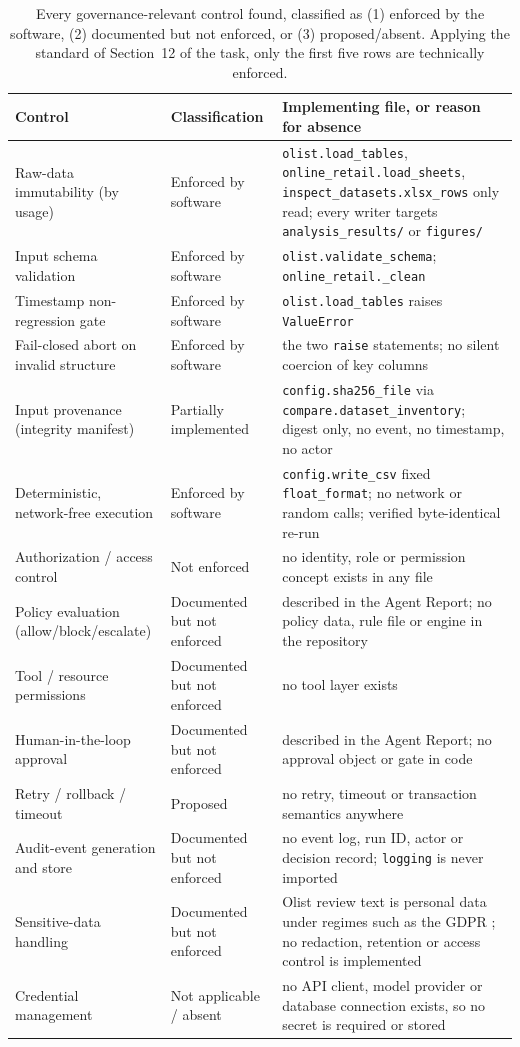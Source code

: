 \documentclass[11pt,a4paper]{article}
\newcommand{\code}[1]{\texttt{#1}}
\begin{document}
\begin{table}[H]
\centering
\small
\begin{tabularx}{\textwidth}{L{3.6cm}L{3.4cm}X}
\toprule
\textbf{Control} & \textbf{Classification} & \textbf{Implementing file, or reason for absence} \\
\midrule
Raw-data immutability (by usage) & Enforced by software & \code{olist.load\_tables}, \code{online\_retail.load\_sheets}, \code{inspect\_datasets.xlsx\_rows} only read; every writer targets \code{analysis\_results/} or \code{figures/} \\
Input schema validation & Enforced by software & \code{olist.validate\_schema}; \code{online\_retail.\_clean} \\
Timestamp non-regression gate & Enforced by software & \code{olist.load\_tables} raises \code{ValueError} \\
Fail-closed abort on invalid structure & Enforced by software & the two \code{raise} statements; no silent coercion of key columns \\
Input provenance (integrity manifest) & Partially implemented & \code{config.sha256\_file} via \code{compare.dataset\_inventory}; digest only, no event, no timestamp, no actor \\
Deterministic, network-free execution & Enforced by software & \code{config.write\_csv} fixed \code{float\_format}; no network or random calls; verified byte-identical re-run \\
Authorization / access control & Not enforced & no identity, role or permission concept exists in any file \\
Policy evaluation (allow/block/escalate) & Documented but not enforced & described in the Agent Report; no policy data, rule file or engine in the repository \\
Tool / resource permissions & Documented but not enforced & no tool layer exists \\
Human-in-the-loop approval & Documented but not enforced & described in the Agent Report; no approval object or gate in code \\
Retry / rollback / timeout & Proposed & no retry, timeout or transaction semantics anywhere \\
Audit-event generation and store & Documented but not enforced & no event log, run ID, actor or decision record; \code{logging} is never imported \\
Sensitive-data handling & Documented but not enforced & Olist review text is personal data under regimes such as the GDPR \cite{gdpr2016}; no redaction, retention or access control is implemented \\
Credential management & Not applicable / absent & no API client, model provider or database connection exists, so no secret is required or stored \\
\bottomrule
\end{tabularx}
\caption{Every governance-relevant control found, classified as (1) enforced by the software, (2) documented but not enforced, or (3) proposed/absent. Applying the standard of Section~12 of the task, only the first five rows are technically enforced.}
\label{tab:controls}
\end{table}
\end{document}
